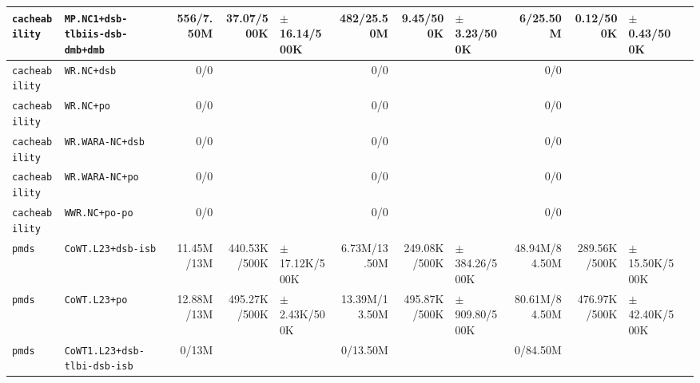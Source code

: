 \begin{tabular}{l l  | r r l | r r l | r r l l}
   \verb|cacheability| &                        \verb|MP.NC1+dsb-tlbiis-dsb-dmb+dmb| &      556/7.50M &            37.07/500K &  $\pm$ 16.14/500K &     482/25.50M &             9.45/500K &   $\pm$ 3.23/500K &       6/25.50M &             0.12/500K &    $\pm$ 0.43/500K & \\ \hline 
   \verb|cacheability| &                                            \verb|WR.NC+dsb| &            0/0 &                       &                   &            0/0 &                       &                   &            0/0 &                       &                    & \\ \hline 
   \verb|cacheability| &                                             \verb|WR.NC+po| &            0/0 &                       &                   &            0/0 &                       &                   &            0/0 &                       &                    & \\ \hline 
   \verb|cacheability| &                                       \verb|WR.WARA-NC+dsb| &            0/0 &                       &                   &            0/0 &                       &                   &            0/0 &                       &                    & \\ \hline 
   \verb|cacheability| &                                        \verb|WR.WARA-NC+po| &            0/0 &                       &                   &            0/0 &                       &                   &            0/0 &                       &                    & \\ \hline 
   \verb|cacheability| &                                         \verb|WWR.NC+po-po| &            0/0 &                       &                   &            0/0 &                       &                   &            0/0 &                       &                    & \\ \hline 
           \verb|pmds| &                                     \verb|CoWT.L23+dsb-isb| &     11.45M/13M &          440.53K/500K & $\pm$ 17.12K/500K &   6.73M/13.50M &          249.08K/500K & $\pm$ 384.26/500K &  48.94M/84.50M &          289.56K/500K &  $\pm$ 15.50K/500K & \\ \hline 
           \verb|pmds| &                                          \verb|CoWT.L23+po| &     12.88M/13M &          495.27K/500K &  $\pm$ 2.43K/500K &  13.39M/13.50M &          495.87K/500K & $\pm$ 909.80/500K &  80.61M/84.50M &          476.97K/500K &  $\pm$ 42.40K/500K & \\ \hline 
           \verb|pmds| &                           \verb|CoWT1.L23+dsb-tlbi-dsb-isb| &          0/13M &                       &                   &       0/13.50M &                       &                   &       0/84.50M &                       &                    & \\ \hline 

\end{tabular}
